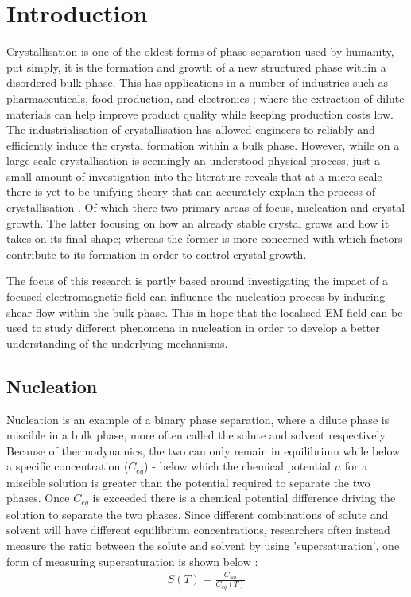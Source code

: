 \chapter{Introduction}
Crystallisation is one of the oldest forms of phase separation 
used by humanity\cite{Schoen1956}, put simply, it is the 
formation and growth of a new structured phase within 
a disordered bulk phase. This has applications in a 
number of industries such as pharmaceuticals, food 
production, and electronics \cite{Myerson2002}; where 
the extraction of dilute materials can help improve 
product quality while keeping production costs low. 
The industrialisation of crystallisation has allowed 
engineers to reliably and efficiently induce the crystal 
formation within a bulk phase. However, while on a 
large scale crystallisation is seemingly an understood 
physical process, just a small amount of investigation 
into the literature reveals that at a micro scale there 
is yet to be unifying theory that can accurately explain 
the process of crystallisation \cite{Fu2021}. Of which 
there two primary areas of focus, nucleation and crystal 
growth. The latter focusing on how an already stable 
crystal grows and how it takes on its final shape; 
whereas the former is more concerned with which factors 
contribute to its formation in order to control crystal growth.

The focus of this research is partly based around investigating
the impact of a focused electromagnetic field can influence the 
nucleation process by inducing shear flow within the bulk phase. 
This in hope that the localised EM field can be used to study 
different phenomena in nucleation in order to develop a better
understanding of the underlying mechanisms.

\section{Nucleation}
Nucleation is an example of a binary phase separation, 
where a dilute phase is miscible in a bulk phase, more 
often called the solute and solvent respectively. Because 
of thermodynamics, the two can only remain in equilibrium while 
below a specific concentration ($C_{eq}$) - below which 
the chemical potential $\mu$ for a miscible solution 
is greater than the potential required to separate 
the two phases. Once $C_{eq}$ is exceeded there is a chemical
 potential difference driving the solution to separate the 
two phases. Since different combinations of solute and solvent
will have different equilibrium concentrations, researchers often 
instead measure the ratio between the solute and solvent by using 
'supersaturation', one form of measuring supersaturation is shown 
below \cite{Mullin2001}:
\begin{align}
	\label{eq:supersaturation}
	S(T) = \frac{C_{sol}}{C_{eq}(T)}
\end{align}

